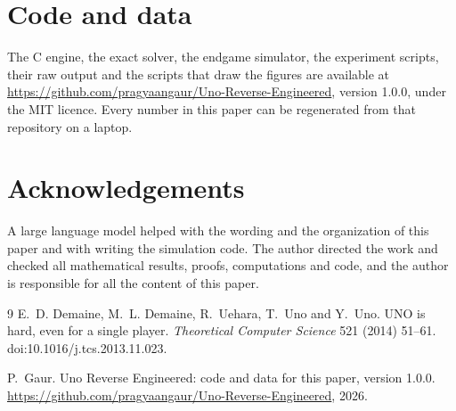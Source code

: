 \documentclass[11pt]{amsart}
\theoremstyle{remark}
\begin{document}
\section*{Code and data}
The C engine, the exact solver, the endgame simulator, the experiment scripts, their raw output and the scripts that draw the figures are available at \url{https://github.com/pragyaangaur/Uno-Reverse-Engineered}, version 1.0.0, under the MIT licence. Every number in this paper can be regenerated from that repository on a laptop.

\section*{Acknowledgements}
A large language model helped with the wording and the organization of this paper and with writing the simulation code. The author directed the work and checked all mathematical results, proofs, computations and code, and the author is responsible for all the content of this paper.

\begin{thebibliography}{9}
E.~D. Demaine, M.~L. Demaine, R.~Uehara, T.~Uno and Y.~Uno.
UNO is hard, even for a single player.
\emph{Theoretical Computer Science} 521 (2014) 51--61.
doi:10.1016/j.tcs.2013.11.023.

P.~Gaur.
Uno Reverse Engineered: code and data for this paper, version 1.0.0.
\url{https://github.com/pragyaangaur/Uno-Reverse-Engineered}, 2026.
\end{thebibliography}
\end{document}
